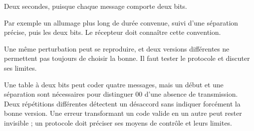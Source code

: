\par\noindent\begin{minipage}{\linewidth}
\label{cor-defi-20}\begin{questions}
\item Deux secondes, puisque chaque message comporte deux bits.
\item Par exemple un allumage plus long de durée convenue, suivi d’une séparation précise, puis les deux bits. Le récepteur doit connaître cette convention.
\item Une même perturbation peut se reproduire, et deux versions différentes ne permettent pas toujours de choisir la bonne. Il faut tester le protocole et discuter ses limites.
\end{questions}
\end{minipage}
\par\noindent\begin{minipage}{\linewidth}
\label{cor-activite-20}
Une table à deux bits peut coder quatre messages, mais un début et une séparation sont nécessaires pour distinguer 00 d’une absence de transmission. Deux répétitions différentes détectent un désaccord sans indiquer forcément la bonne version. Une erreur transformant un code valide en un autre peut rester invisible ; un protocole doit préciser ses moyens de contrôle et leurs limites.\par\end{minipage}
